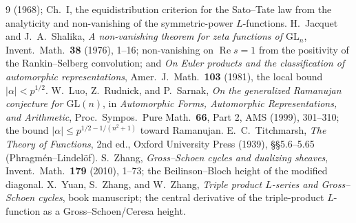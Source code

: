 \documentclass[11pt]{article}
\theoremstyle{definition}
\renewcommand{\Re}{\operatorname{Re}}
\begin{document}
\begin{thebibliography}{9}
(1968); Ch.~I, the equidistribution criterion for the Sato--Tate law from the analyticity and
non-vanishing of the symmetric-power $L$-functions.
 H.~Jacquet and J.~A.~Shalika, \emph{A non-vanishing theorem for zeta functions of
$\mathrm{GL}_n$}, Invent.\ Math.\ \textbf{38} (1976), 1--16; non-vanishing on $\Re s=1$ from the
positivity of the Rankin--Selberg convolution; and \emph{On Euler products and the classification of
automorphic representations}, Amer.\ J.\ Math.\ \textbf{103} (1981), the local bound $|\alpha|<p^{1/2}$.
 W.~Luo, Z.~Rudnick, and P.~Sarnak, \emph{On the generalized Ramanujan conjecture for
$\mathrm{GL}(n)$}, in \emph{Automorphic Forms, Automorphic Representations, and Arithmetic}, Proc.\
Sympos.\ Pure Math.\ \textbf{66}, Part 2, AMS (1999), 301--310; the bound
$|\alpha|\le p^{1/2-1/(n^2+1)}$ toward Ramanujan.
 E.~C.~Titchmarsh, \emph{The Theory of Functions}, 2nd ed., Oxford University
Press (1939), \S\S5.6--5.65 (Phragm\'en--Lindel\"of).
 S.~Zhang, \emph{Gross--Schoen cycles and dualizing sheaves}, Invent.\ Math.\
\textbf{179} (2010), 1--73; the Beilinson--Bloch height of the modified diagonal.
\bibitem{YZZ} X.~Yuan, S.~Zhang, and W.~Zhang, \emph{Triple product $L$-series and Gross--Schoen
cycles}, book manuscript; the central derivative of the triple-product $L$-function as a
Gross--Schoen/Ceresa height.
\end{thebibliography}
\end{document}
